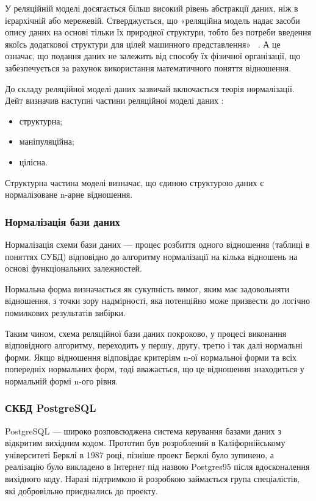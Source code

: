 У реляційній моделі досягається більш високий рівень абстракції даних, ніж в ієрархічній або мережевій. Стверджується, що «реляційна модель надає засоби опису даних на основі тільки їх природної структури, тобто без потреби введення якоїсь додаткової структури для цілей машинного представлення»~ \cite{codd1970relational}. А це означає, що подання даних не залежить від способу їх фізичної організації, що забезпечується за рахунок використання математичного поняття відношення.

До складу реляційної моделі даних зазвичай включається теорія нормалізації. Дейт визначив наступні частини реляційної моделі даних \cite{дейт2008введение}:
\begin{itemize}
	\item структурна;
	\item маніпуляційна;
	\item цілісна.
\end{itemize}

Структурна частина моделі визначає, що єдиною структурою даних є нормалізоване n-арне відношення.


\subsubsection{Нормалізація бази даних}

Нормалізація схеми бази даних — процес розбиття одного відношення (таблиці в поняттях СУБД) відповідно до алгоритму нормалізації на кілька відношень на основі функціональних залежностей.

Нормальна форма визначається як сукупність вимог, яким має задовольняти відношення, з точки зору надмірності, яка потенційно може призвести до логічно помилкових результатів вибірки.

Таким чином, схема реляційної бази даних покроково, у процесі виконання відповідного алгоритму, переходить у першу, другу, третю і так далі нормальні форми. Якщо відношення відповідає критеріям n-ої нормальної форми та всіх попередніх нормальних форм, тоді вважається, що це відношення знаходиться у нормальній формі n-ого рівня.

\subsubsection{СКБД PostgreSQL}

PostgreSQL — широко розповсюджена система керування базами даних з відкритим вихідним кодом. Прототип був розроблений в Каліфорнійському університеті Берклі в 1987 році, пізніше проект Берклі було зупинено, а реалізацію було викладено в Інтернет під назвою Postgres95 після вдосконалення вихідного коду. Наразі підтримкою й розробкою займається група спеціалістів, які добровільно приєднались до проекту.


